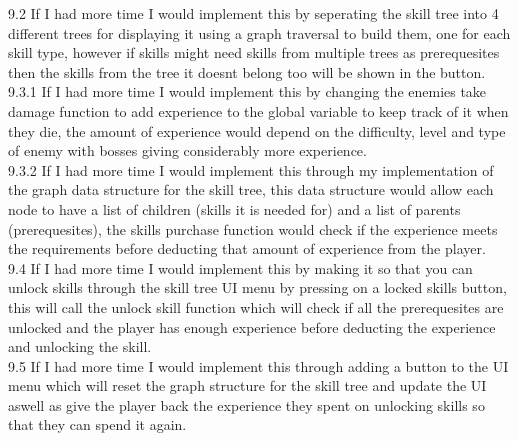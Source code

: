 \documentclass{article}
\begin{document}
        9.2 If I had more time I would implement this by seperating the skill tree into 4 different trees for displaying it using a graph traversal to build them, one for each skill type, however if skills might need skills from multiple trees as prerequesites then the skills from the tree it doesnt belong too will be shown in the button.\\
        9.3.1 If I had more time I would implement this by changing the enemies take damage function to add experience to the global variable to keep track of it when they die, the amount of experience would depend on the difficulty, level and type of enemy with bosses giving considerably more experience.\\
        9.3.2 If I had more time I would implement this through my implementation of the graph data structure for the skill tree, this data structure would allow each node to have a list of children (skills it is needed for) and a list of parents (prerequesites), the skills purchase function would check if the experience meets the requirements before deducting that amount of experience from the player.\\
        9.4 If I had more time I would implement this by making it so that you can unlock skills through the skill tree UI menu by pressing on a locked skills button, this will call the unlock skill function which will check if all the prerequesites are unlocked and the player has enough experience before deducting the experience and unlocking the skill.\\
        9.5 If I had more time I would implement this through adding a button to the UI menu which will reset the graph structure for the skill tree and update the UI aswell as give the player back the experience they spent on unlocking skills so that they can spend it again.\\
\end{document}
